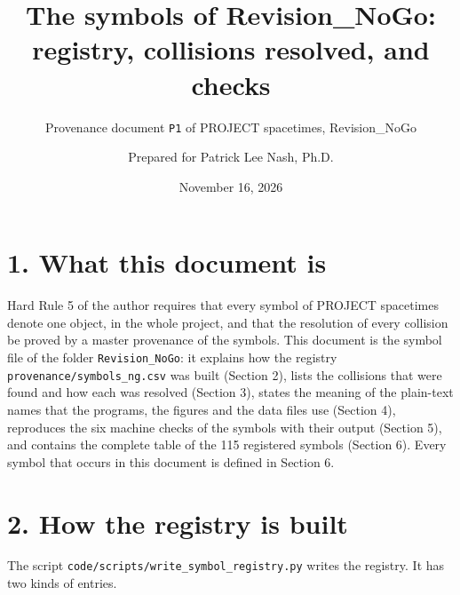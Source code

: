 \documentclass[
  10pt,
]{article}
\title{The symbols of Revision\_NoGo: registry, collisions resolved, and
checks}
\subtitle{Provenance document \texttt{P1} of PROJECT spacetimes,
Revision\_NoGo}
\author{Prepared for Patrick Lee Nash, Ph.D.}
\date{November 16, 2026}
\begin{document}
\maketitle

\hypertarget{what-this-document-is}{%
\section{1. What this document is}\label{what-this-document-is}}

Hard Rule 5 of the author requires that every symbol of PROJECT
spacetimes denote one object, in the whole project, and that the
resolution of every collision be proved by a master provenance of the
symbols. This document is the symbol file of the folder
\texttt{Revision\_NoGo}: it explains how the registry
\texttt{provenance/symbols\_ng.csv} was built (Section 2), lists the
collisions that were found and how each was resolved (Section 3), states
the meaning of the plain-text names that the programs, the figures and
the data files use (Section 4), reproduces the six machine checks of the
symbols with their output (Section 5), and contains the complete table
of the 115 registered symbols (Section 6). Every symbol that occurs in
this document is defined in Section 6.

\hypertarget{how-the-registry-is-built}{%
\section{2. How the registry is built}\label{how-the-registry-is-built}}

The script \texttt{code/scripts/write\_symbol\_registry.py} writes the
registry. It has two kinds of entries.
\end{document}
